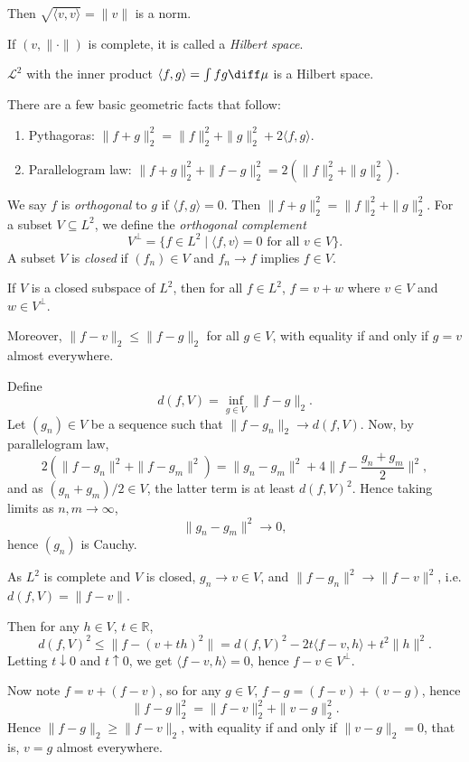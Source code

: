 \documentclass[12pt]{article}
\begin{document}
Then $\sqrt{\langle v, v\rangle} = \|v\|$ is a norm.

If $(v, \|\cdot\|)$ is complete, it is called a \emph{Hilbert space}.

\begin{corollary}
	$\mathcal{L}^2$ with the inner product $\langle f, g\rangle = \int fg \diff \mu$ is a Hilbert space.
\end{corollary}

There are a few basic geometric facts that follow:
\begin{enumerate}
	\item Pythagoras: $\|f+g\|_2^2 = \|f\|_2^2 + \|g\|_2^2 + 2 \langle f, g\rangle$.
	\item Parallelogram law: $\|f+g\|_2^2 + \|f-g\|_2^2 = 2(\|f\|_2^2 + \|g\|_2^2)$.
\end{enumerate}
We say $f$ is \emph{orthogonal} to $g$ if $\langle f, g\rangle = 0$. Then $\|f+g\|_2^2 = \|f\|_2^2 + \|g\|_2^2$. For a subset $V \subseteq L^2$, we define the \emph{orthogonal complement}
\[
	V^{\perp} = \{f \in L^2 \mid \langle f, v\rangle = 0 \text{ for all } v \in V\}.
\]
A subset $V$ is \emph{closed} if $(f_n) \in V$ and $f_n \to f$ implies $f \in V$.
\begin{theorem}
	If $V$ is a closed subspace of $L^2$, then for all $f \in L^2$, $f = v + w$ where $v \in V$ and $w \in V^{\perp}$.

	Moreover, $\|f - v\|_2 \leq \|f - g\|_2$ for all $g \in V$, with equality if and only if $g = v$ almost everywhere.
\end{theorem}


\begin{proofbox}
	Define
	\[
	d(f, V) = \inf_{g \in V} \|f - g\|_2.
	\]
	Let $(g_n) \in V$ be a sequence such that $\|f - g_n\|_2 \to d(f, V)$. Now, by parallelogram law,
	\[
	2(\|f - g_n\|^2 + \|f - g_m\|^2) = \|g_n - g_m\|^2 + 4 \biggl\|f - \frac{g_n +g_m}{2}\biggr\|^2,
	\]
	and as $(g_n+g_m)/2 \in V$, the latter term is at least $d(f, V)^2$. Hence taking limits as $n, m \to \infty$,
	\[
	\|g_n-g_m\|^2 \to 0,
	\]
	hence $(g_n)$ is Cauchy.

	As $L^2$ is complete and $V$ is closed, $g_n \to v \in V$, and $\|f -g_n\|^2 \to\|f-v\|^2$, i.e. $d(f,V)=\|f-v\|$.

	Then for any $h \in V$, $t \in \mathbb{R}$,
	\[
	d(f, V)^2 \leq \|f - (v+th)^2\|=d(f,V)^2- 2t\langle f-v,h\rangle + t^2 \|h\|^2.
	\]
	Letting $t \downarrow 0$ and $t \uparrow 0$, we get $\langle f - v, h \rangle = 0$, hence $f - v \in V^{\perp}$.

	Now note $f = v + (f - v)$, so for any $g \in V$, $f - g = (f - v) + (v - g)$, hence
	\[
	\|f-g\|_2^2 = \|f-v\|_2^2+\|v-g\|_2^2.
	\]
	Hence $\|f-g\|_2\geq \|f-v\|_2$, with equality if and only if $\|v-g\|_2 = 0$, that is, $v = g$ almost everywhere.
\end{proofbox}
\end{document}
